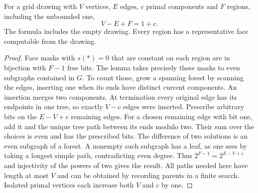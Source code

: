 \begin{theorem}\label{thm:gridEuler}\label{idx-plane22}
For a grid drawing with $V$ vertices, $E$ edges, $c$ primal components and $F$ regions, including the unbounded one,
\[
                  V-E+F=1+c .
\]
The formula includes the empty drawing. Every region has a representative face computable from the drawing.
\end{theorem}
\begin{proof}
Face masks with $s(*)=0$ that are constant on each region are in bijection with $F-1$ free bits. The lemma takes precisely these masks to even subgraphs contained in $G$. To count those, grow a spanning forest by scanning the edges, inserting one when its ends have distinct current components. An insertion merges two components. At termination every original edge has its endpoints in one tree, so exactly $V-c$ edges were inserted. Prescribe arbitrary bits on the $E-V+c$ remaining edges. For a chosen remaining edge with bit one, add it and the unique tree path between its ends modulo two. Their sum over the choices is even and has the prescribed bits. The difference of two solutions is an even subgraph of a forest. A nonempty such subgraph has a leaf, as one sees by taking a longest simple path, contradicting even degree. Thus $2^{F-1}=2^{E-V+c}$ and injectivity of the powers of two gives the result. All paths needed here have length at most $V$ and can be obtained by recording parents in a finite search. Isolated primal vertices each increase both $V$ and $c$ by one.
\end{proof}

